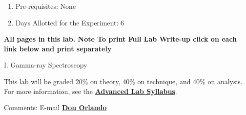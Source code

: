 \documentclass{../lab}
\begin{document}
\begin{enumerate}
    \item Pre-requisites: None

    \item Days Allotted for the Experiment: 6

\end{enumerate}

\textbf{All pages in this lab. Note To print Full Lab Write-up click on each link below and print separately}

I. Gamma-ray Spectroscopy

This lab will be graded 20\% on theory, 40\% on technique, and 40\% on analysis. For more information, see the \href{\AdvancedLabSyllabus}{\textbf{Advanced Lab Syllabus}}.

Comments: E-mail \href{\MailDonOrlando}{\textbf{Don Orlando}}
\end{document}
